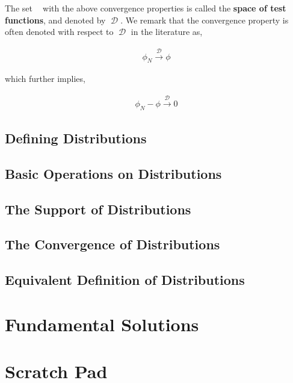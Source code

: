 \documentclass[12pt, a4]{article}
\DeclareMathOperator\tfspace{C_0^\infty}
\DeclareMathOperator\tfspaceD{\mathcal{D}}
\begin{document}
The set $\tfspace$ with the above convergence properties is called the \textbf{space of test functions}, and denoted by $\tfspaceD$. We remark that the convergence property is often denoted with respect to $\tfspaceD$ in the literature as,

\begin{eqnarray}
    \phi_N \overset{\tfspaceD}{\rightarrow} \phi
\end{eqnarray}

which further implies,

\begin{eqnarray}
    \phi_N - \phi \overset{\tfspaceD}{\rightarrow} 0
\end{eqnarray}

\subsection{Defining Distributions}

\subsection{Basic Operations on Distributions}

\subsection{The Support of Distributions}

\subsection{The Convergence of Distributions}

\subsection{Equivalent Definition of Distributions}


\section{Fundamental Solutions}


\section{Scratch Pad}
\end{document}
